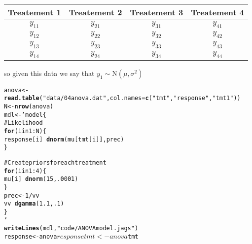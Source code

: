 \documentclass[12pt,letterpaper,oneside]{article}\usepackage{graphicx, color}
\makeatletter
\newcommand{\hlfunctioncall}[1]{\textcolor[rgb]{0.501960784313725,0,0.329411764705882}{\textbf{#1}}}%
\newcommand{\hlstring}[1]{\textcolor[rgb]{0.6,0.6,1}{#1}}%
\newcommand{\hlcomment}[1]{\textcolor[rgb]{0.180392156862745,0.6,0.341176470588235}{#1}}%
\newenvironment{kframe}{%
 \def\at@end@of@kframe{}%
 \ifinner\ifhmode%
  \def\at@end@of@kframe{\end{minipage}}%
  \begin{minipage}{\columnwidth}%
 \fi\fi%
 \def\FrameCommand##1{\hskip\@totalleftmargin \hskip-\fboxsep
 \colorbox{shadecolor}{##1}\hskip-\fboxsep
     \hskip-\linewidth \hskip-\@totalleftmargin \hskip\columnwidth}%
 \MakeFramed {\advance\hsize-\width
   \@totalleftmargin\z@ \linewidth\hsize
   \@setminipage}}%
 {\par\unskip\endMakeFramed%
 \at@end@of@kframe}
\newenvironment{knitrout}{}{} %
\makeatother
\begin{document}
\begin{tabular}{c|c|c|c}
Treatement 1& Treatement 2 & Treatement 3 & Treatement 4\\
\hline
$y_{11}$ & $y_{21}$ & $y_{31}$ & $y_{41}$ \\
$y_{12}$ & $y_{22}$ & $y_{32}$ & $y_{42}$ \\
$y_{13}$ & $y_{23}$ & $y_{33}$ & $y_{43}$ \\
$y_{14}$ & $y_{24}$ & $y_{34}$ & $y_{44}$ \\
\end{tabular}

so given this data we say that
$y_{1}\sim \mathrm{N}(\mu,\sigma^{2})$

\begin{knitrout}\scriptsize
{}\color{fgcolor}\begin{kframe}
\begin{alltt}
anova <- \hlfunctioncall{read.table}(\hlstring{"data/04anova.dat"} ,col.names=\hlfunctioncall{c}(\hlstring{"tmt"},\hlstring{"response"},\hlstring{"tmt1"}))
N <- \hlfunctioncall{nrow}(anova)
mdl <- 'model \{
\hlcomment{    # Likelihood}
    \hlfunctioncall{for} (i in 1:N)\{
        response[i] ~ \hlfunctioncall{dnorm}(mu[tmt[i]], prec)
    \}

\hlcomment{    # Create priors for each treatment}
    \hlfunctioncall{for}(i in 1:4)\{
        mu[i] ~ \hlfunctioncall{dnorm}(15,.0001)
    \}
    prec <- 1/vv
    vv ~ \hlfunctioncall{dgamma}(1.1,.1)
\}
'
\hlfunctioncall{writeLines}(mdl, \hlstring{"code/ANOVAmodel.jags"})
response <- anova$response
tmt <- anova$tmt
\end{alltt}
\end{kframe}
\end{knitrout}
\end{document}
